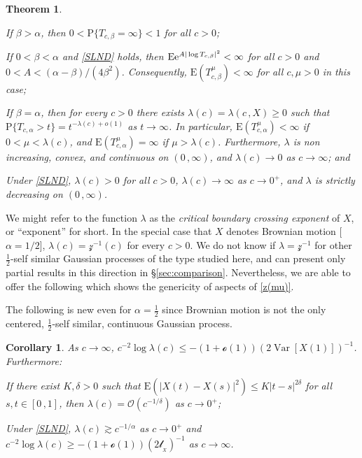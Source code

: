 \documentclass[reqno]{amsart}
\DeclareMathOperator{\Var}{Var}
\newcommand{\<}{\langle}
\renewcommand{\>}{\rangle}
\renewcommand{\P}{\mathrm{P}}
\newcommand{\E}{\mathrm{E}}
\newcommand{\1}{\mathbb{1}}
\newcommand{\e}{{\rm e}}
\renewcommand{\ge}{\geqslant}
\renewcommand{\le}{\leqslant}
\newtheorem{corollary}[stat]{Corollary}
\newtheorem{theorem}[stat]{Theorem}
\theoremstyle{definition}
\numberwithin{equation}{section}
\begin{document}
\begin{theorem}\label{th:main}
	\begin{compactenum}[\rm (1)]
	\item If $\beta>\alpha$, then
		$0<\P\{T_{c,\beta}=\infty\}<1$
		for all $c>0$;
	\item If $0<\beta<\alpha$ and \eqref{SLND} holds, then
		$\E\e^{A|\log T_{c,\beta}|^2 } <\infty$
		for all $c>0$ and $0<A<(\alpha-\beta)/(4\beta^2)$.
		Consequently, $\E(T_{c,\beta}^\mu)<\infty$ for all $c,\mu>0$ in this case; 
	\item If $\beta=\alpha$, then for every $c>0$
		there exists $\lambda(c)=\lambda(c\,,X)\ge0$ such that
		$\P\{ T_{c,\alpha}>t\} = t^{-\lambda(c)+o(1)}$ as $t\to\infty$.
		In particular,
		$\E(T_{c,\alpha}^\mu)<\infty$ if $0<\mu<\lambda(c)$, and
		$\E(T_{c,\alpha}^\mu)=\infty$ if $\mu>\lambda(c)$.
		Furthermore, $\lambda$ is non increasing, convex, and 
		continuous on $(0\,,\infty)$, and $\lambda(c)\to0$ as $c\to\infty$; and
	\item Under \eqref{SLND}, $\lambda(c)>0$ for all $c>0$, 
		$\lambda(c) \to \infty$ as $c\to0^+$, and $\lambda$ is strictly decreasing on $(0\,,\infty)$.
	\end{compactenum}
\end{theorem}

We might refer to the function $\lambda$ as the \emph{critical boundary crossing exponent}
of $X$, or ``exponent'' for short.
In the special case that $X$ denotes Brownian motion [$\alpha=1/2$],
$\lambda(c)=\mathcal{z}^{-1}(c)$ for every $c>0$.
We do not know if $\lambda=\mathcal{z}^{-1}$ for other $\frac12$-self similar
Gaussian processes of the type studied here, and can present only partial results in this direction
in \S\ref{sec:comparison}. Nevertheless, 
we are able to offer the following which shows the genericity of 
aspects of \eqref{z(mu)}.

The following is new even for $\alpha=\frac12$ since
Brownian motion is not the only centered, $\frac12$-self similar, continuous
Gaussian process. 

\begin{corollary}\label{cor:main}
	As $c\to\infty$, 
	$c^{-2}\log\lambda(c) \le -(1+\mathcal{o}(1))(2\Var[X(1)])^{-1}$.
	Furthermore: \begin{compactenum}
	\item If there exist $K,\delta>0$ such that
		$\E(|X(t)-X(s)|^2)\le K|t-s|^{2\delta}$ for all $s,t\in[0\,,1]$, then
		$\lambda(c) =\mathcal{O}( c^{-1/\delta})$
		as $c\to0^+$;
	\item Under \eqref{SLND}, 
		$\lambda(c) \gtrsim  c^{-1/\alpha}$ as $c\to0^+$ and
		$c^{-2} \log \lambda(c) \ge -(1+\mathcal{o}(1))(2\mathscr{l}_{_X})^{-1}$
		as $c\to\infty$.
	\end{compactenum}
\end{corollary}
\end{document}
